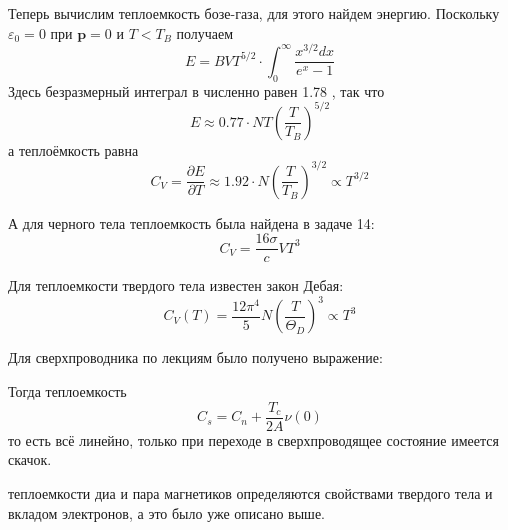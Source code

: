 \documentclass[a4paper,12pt]{article} %
\begin{document}
\begin{ttask}
Теперь вычислим теплоемкость бозе-газа, для этого найдем энергию. 
Поскольку $\varepsilon_{0}=0$ при $\mathbf{p}=0$ и $T<T_{B}$ получаем
$$
E=B V T^{5 / 2} \cdot \int_{0}^{\infty} \frac{x^{3 / 2} d x}{e^{x}-1}
$$
Здесь безразмерный интеграл в численно равен 1.78 , так что
$$
E \approx 0.77 \cdot N T\left(\frac{T}{T_{B}}\right)^{5 / 2}
$$
а теплоёмкость равна
$$
C_{V}
=
\frac{\partial E}{\partial T} 
\approx 
1.92 \cdot N\left(\frac{T}{T_{B}}\right)^{3 / 2} 
\propto 
T^{3 / 2}
$$




А для черного тела теплоемкость была найдена в задаче 14:
$$
C_{V}=\frac{16 \sigma}{c} V T^{3}
$$





Для теплоемкости твердого тела известен закон Дебая:
$$
C_{V}(T)=\frac{12 \pi^{4}}{5} N\left(\frac{T}{\Theta_{D}}\right)^{3} \propto T^{3}
$$



Для сверхпроводника по лекциям было получено выражение:

Тогда теплоемкость
$$
C_{s}
=
C_{n}+\frac{T_{c}}{2 A} \nu(0)
$$
то есть всё линейно, только при переходе в сверхпроводящее состояние имеется скачок.




теплоемкости диа и пара магнетиков определяются свойствами твердого тела и вкладом электронов, 
а это было уже описано выше.











\end{ttask}
\end{document}
